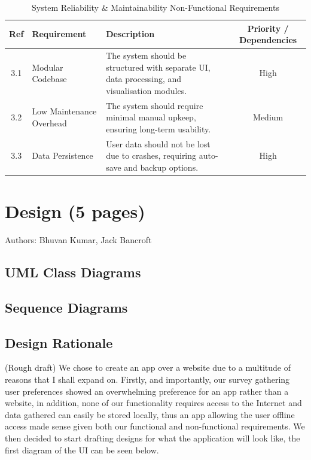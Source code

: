 \documentclass[12pt,a4paper]{article}
\begin{document}
\begin{table}[h]
    \centering

    \renewcommand{\arraystretch}{1.3} %
    \begin{tabular}{|c|l|p{5.5cm}|c|} %
        \hline
        \textbf{Ref} & \textbf{Requirement} & \textbf{Description} & \textbf{Priority / Dependencies} \\
        \hline
        3.1 & Modular Codebase & The system should be structured with separate UI, data processing, and visualisation modules. & High \\
        \hline
        3.2 & Low Maintenance Overhead & The system should require minimal manual upkeep, ensuring long-term usability. & Medium \\
        \hline
        3.3 & Data Persistence & User data should not be lost due to crashes, requiring auto-save and backup options. & High \\
        \hline
    \end{tabular}
    \caption{System Reliability \& Maintainability Non-Functional Requirements}
    \label{tab:system_reliability}
\end{table}







\newpage

\section{Design (5 pages)}

Authors: Bhuvan Kumar, Jack Bancroft
\label{sec:design}
\subsection{UML Class Diagrams}

\subsection{Sequence Diagrams}

\subsection{Design Rationale}

(Rough draft) We chose to create an app over a website due to a multitude of reasons that I shall expand on. Firstly, and importantly, our survey gathering user preferences showed an overwhelming preference for an app rather than a website, in addition, none of our functionality requires access to the Internet and data gathered can easily be stored locally, thus an app allowing the user offline access made sense given both our functional and non-functional requirements. We then decided to start drafting designs for what the application will look like, the first diagram of the UI can be seen below. 
\end{document}
